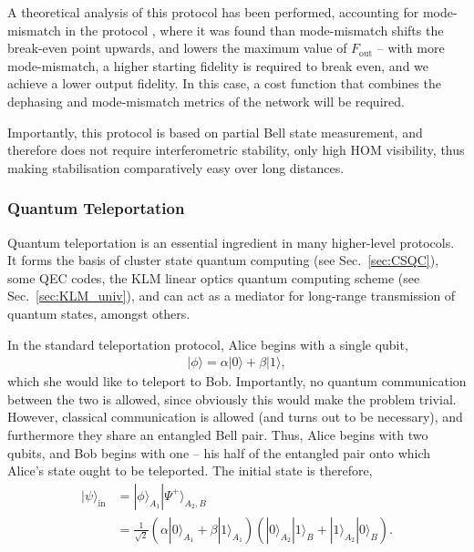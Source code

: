 \documentclass[aps,rmp,twocolumn,amsmath,amssymb,nofootinbib,superscriptaddress]{revtex4}
\newcommand{\ket}[1]{|#1\rangle}
\begin{document}
A theoretical analysis of this protocol has been performed, accounting for mode-mismatch in the protocol \cite{bib:RohdeOptEntPur06}, where it was found than mode-mismatch shifts the break-even point upwards, and lowers the maximum value of $F_\mathrm{out}$ -- with more mode-mismatch, a higher starting fidelity is required to break even, and we achieve a lower output fidelity. In this case, a cost function that combines the dephasing and mode-mismatch metrics of the network will be required.

Importantly, this protocol is based on partial Bell state measurement, and therefore does not require interferometric stability, only high HOM visibility, thus making stabilisation comparatively easy over long distances.

%
%

\subsubsection{Quantum Teleportation} \label{sec:teleport}

Quantum teleportation \cite{???} is an essential ingredient in many higher-level protocols. It forms the basis of cluster state quantum computing (see Sec.~\ref{sec:CSQC}), some QEC codes, the KLM linear optics quantum computing scheme (see Sec.~\ref{sec:KLM_univ}), and can act as a mediator for long-range transmission of quantum states, amongst others.

In the standard teleportation protocol, Alice begins with a single qubit,
\begin{align}
\ket\phi = \alpha\ket{0} +\beta\ket{1},
\end{align}
which she would like to teleport to Bob. Importantly, no quantum communication between the two is allowed, since obviously this would make the problem trivial. However, classical communication is allowed (and turns out to be necessary), and furthermore they share an entangled Bell pair. Thus, Alice begins with two qubits, and Bob begins with one -- his half of the entangled pair onto which Alice's state ought to be teleported. The initial state is therefore,
\begin{align}
\ket\psi_\mathrm{in} &= \ket{\phi}_{A_1} \ket{\Psi^+}_{A_2,B} \nonumber \\
&= \frac{1}{\sqrt{2}} (\alpha\ket{0}_{A_1}+\beta\ket{1}_{A_1}) (\ket{0}_{A_2}\ket{1}_B + \ket{1}_{A_2}\ket{0}_B).
\end{align}
\end{document}
